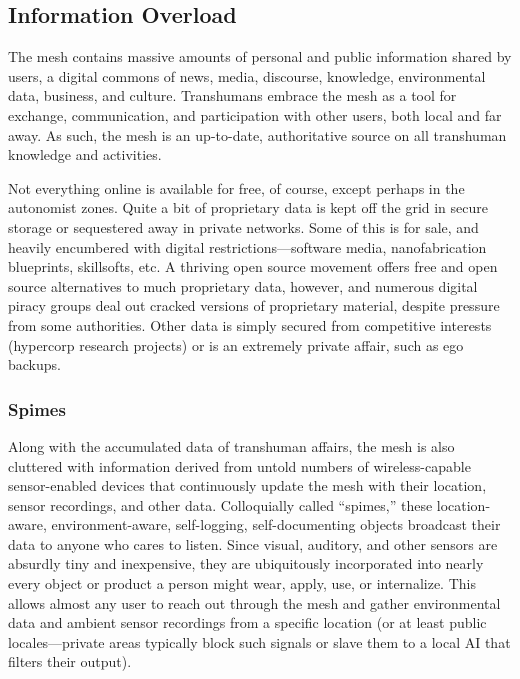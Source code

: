 \subsection{Information Overload}

The mesh contains massive amounts of personal and 
public information shared by users, a digital commons 
of news, media, discourse, knowledge, environmental 
data, business, and culture. Transhumans embrace 
the mesh as a tool for exchange, communication, 
and participation with other users, both local and far 
away. As such, the mesh is an up-to-date, authoritative 
source on all transhuman knowledge and activities.

Not everything online is available for free, of course, 
except perhaps in the autonomist zones. Quite a bit of 
proprietary data is kept off the grid in secure storage 
or sequestered away in private networks. Some of this 
is for sale, and heavily encumbered with digital restrictions—software
media, nanofabrication blueprints,
skillsofts, etc. A thriving open source movement offers 
free and open source alternatives to much proprietary 
data, however, and numerous digital piracy groups 
deal out cracked versions of proprietary material, 
despite pressure from some authorities. Other data is 
simply secured from competitive interests (hypercorp 
research projects) or is an extremely private affair, 
such as ego backups.

\subsubsection{Spimes}

Along with the accumulated data of transhuman 
affairs, the mesh is also cluttered with information 
derived from untold numbers of wireless-capable sensor-enabled
devices that continuously update the mesh
with their location, sensor recordings, and other data. 
Colloquially called ``spimes,'' these location-aware, 
environment-aware, self-logging, self-documenting 
objects broadcast their data to anyone who cares to 
listen. Since visual, auditory, and other sensors are 
absurdly tiny and inexpensive, they are ubiquitously 
incorporated into nearly every object or product a 
person might wear, apply, use, or internalize. This 
allows almost any user to reach out through the mesh 
and gather environmental data and ambient sensor 
recordings from a specific location (or at least public 
locales—private areas typically block such signals or 
slave them to a local AI that filters their output).

